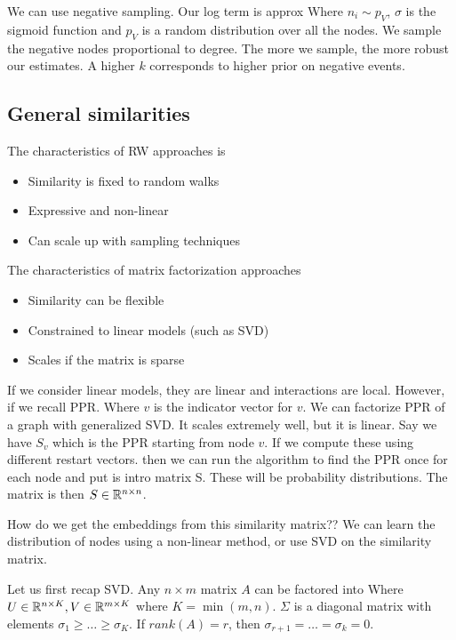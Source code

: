     We can use negative sampling. Our log term is approx
    Where $n_i \sim p_V$, $\sigma$ is the sigmoid function and $p_V$ is a random distribution over all the nodes. We sample the negative nodes proportional to degree. The more we sample, the more robust our estimates. A higher $k$ corresponds to higher prior on negative events. 
    
\subsection{General similarities}
    The characteristics of RW approaches is
    \begin{itemize}
        \item Similarity is fixed to random walks
        \item Expressive and non-linear
        \item Can scale up with sampling techniques
    \end{itemize}
    The characteristics of matrix factorization approaches
    \begin{itemize}
        \item Similarity can be flexible
        \item Constrained to linear models (such as SVD)
        \item Scales if the matrix is sparse
    \end{itemize}
    
    If we consider linear models, they are linear and interactions are local. However, if we recall PPR. 
    Where $v$ is the indicator vector for $v$. We can factorize PPR of a graph with generalized SVD. It scales extremely well, but it is linear. Say we have $S_v$ which is the PPR starting from node $v$. If we compute these using different restart vectors. 
    then we can run the algorithm to find the PPR once for each node and put is intro matrix S. These will be probability distributions. The matrix is then $S \in \mathbb{R}^{n \times n}$.
    
    How do we get the embeddings from this similarity matrix?? We can learn the distribution of nodes using a non-linear method, or use SVD on the similarity matrix. 
    
    Let us first recap SVD. Any $n \times m$ matrix $A$ can be factored into
    Where $U \in \mathbb{R}^{n \times K}, V \in \mathbb{R}^{m \times K}$ where $K = \min(m, n)$. $\Sigma$ is a diagonal matrix with elements $\sigma_1 \geq \dots \geq \sigma_K$. If $rank(A) = r$, then $\sigma_{r+1} = \dots = \sigma_k = 0$.
    
